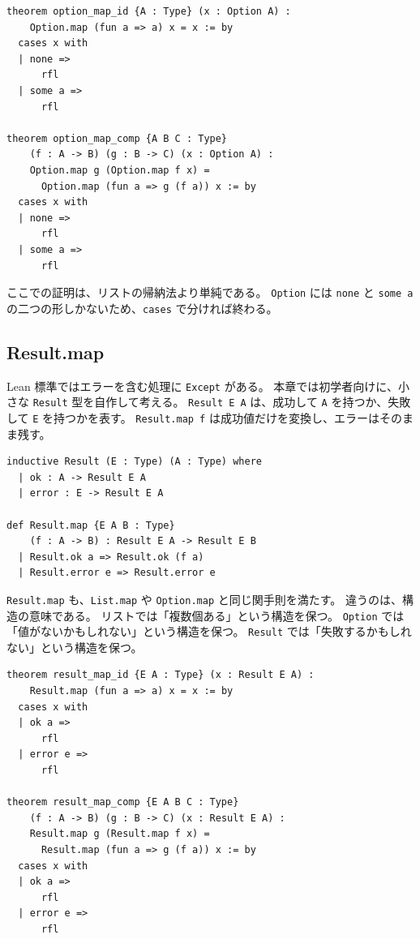 \begin{listing}[htbp]
\begin{verbatim}
theorem option_map_id {A : Type} (x : Option A) :
    Option.map (fun a => a) x = x := by
  cases x with
  | none =>
      rfl
  | some a =>
      rfl

theorem option_map_comp {A B C : Type}
    (f : A -> B) (g : B -> C) (x : Option A) :
    Option.map g (Option.map f x) =
      Option.map (fun a => g (f a)) x := by
  cases x with
  | none =>
      rfl
  | some a =>
      rfl
\end{verbatim}
\caption{Option.map の二つの関手則}
\label{lst:ch08_option_map_laws}
\end{listing}

ここでの証明は、リストの帰納法より単純である。
\texttt{Option} には \texttt{none} と \texttt{some a} の二つの形しかないため、\texttt{cases} で分ければ終わる。

\subsection{Result.map}

Lean 標準ではエラーを含む処理に \texttt{Except} がある。
本章では初学者向けに、小さな \texttt{Result} 型を自作して考える。
\texttt{Result E A} は、成功して \texttt{A} を持つか、失敗して \texttt{E} を持つかを表す。
\texttt{Result.map f} は成功値だけを変換し、エラーはそのまま残す。

\begin{listing}[htbp]
\begin{verbatim}
inductive Result (E : Type) (A : Type) where
  | ok : A -> Result E A
  | error : E -> Result E A

def Result.map {E A B : Type}
    (f : A -> B) : Result E A -> Result E B
  | Result.ok a => Result.ok (f a)
  | Result.error e => Result.error e
\end{verbatim}
\caption{成功値だけを変換する Result.map}
\label{lst:ch08_result_map}
\end{listing}

\texttt{Result.map} も、\texttt{List.map} や \texttt{Option.map} と同じ関手則を満たす。
違うのは、構造の意味である。
リストでは「複数個ある」という構造を保つ。
\texttt{Option} では「値がないかもしれない」という構造を保つ。
\texttt{Result} では「失敗するかもしれない」という構造を保つ。

\begin{listing}[htbp]
\begin{verbatim}
theorem result_map_id {E A : Type} (x : Result E A) :
    Result.map (fun a => a) x = x := by
  cases x with
  | ok a =>
      rfl
  | error e =>
      rfl

theorem result_map_comp {E A B C : Type}
    (f : A -> B) (g : B -> C) (x : Result E A) :
    Result.map g (Result.map f x) =
      Result.map (fun a => g (f a)) x := by
  cases x with
  | ok a =>
      rfl
  | error e =>
      rfl
\end{verbatim}
\caption{Result.map の二つの関手則}
\label{lst:ch08_result_map_laws}
\end{listing}

